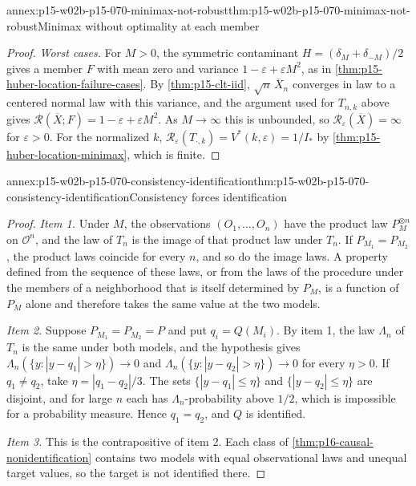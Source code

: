 \begin{annexitem}{annex:p15-w02b-p15-070-minimax-not-robust}{thm:p15-w02b-p15-070-minimax-not-robust}{Minimax without optimality at each member}
\begin{proof}
\emph{Worst cases.} For \(M>0\), the symmetric contaminant
\(H=(\delta_M+\delta_{-M})/2\) gives a member \(F\) with mean zero and
variance \(1-\varepsilon+\varepsilon M^2\), as in
\cref{thm:p15-huber-location-failure-cases}. By
\cref{thm:p15-clt-iid}, \(\sqrt n\,\overline X_n\) converges in law to
a centered normal law with this variance, and the argument used for
\(T_{n,k}\) above gives \(\mathcal R(\overline X;F)=1-\varepsilon
+\varepsilon M^2\). As \(M\to\infty\) this is unbounded, so
\(\mathcal R_\varepsilon(\overline X)=\infty\) for \(\varepsilon>0\).
For the normalized \(k\),
\(\mathcal R_\varepsilon(T_{\cdot,k})=V^*(k,\varepsilon)=1/I_*\) by
\cref{thm:p15-huber-location-minimax}, which is finite.
\end{proof}
\end{annexitem}

\begin{annexitem}{annex:p15-w02b-p15-070-consistency-identification}{thm:p15-w02b-p15-070-consistency-identification}{Consistency forces identification}
\begin{proof}
\emph{Item 1.} Under \(M\), the observations
\((O_1,\ldots,O_n)\) have the product law \(P_M^{\otimes n}\) on
\(\mathcal O^n\), and the law of \(T_n\) is the image of that product
law under \(T_n\). If \(P_{M_1}=P_{M_2}\), the product laws coincide for
every \(n\), and so do the image laws. A property defined from the
sequence of these laws, or from the laws of the procedure under the
members of a neighborhood that is itself determined by \(P_M\), is a
function of \(P_M\) alone and therefore takes the same value at the two
models.

\emph{Item 2.} Suppose \(P_{M_1}=P_{M_2}=P\) and put
\(q_i=Q(M_i)\). By item 1, the law \(\Lambda_n\) of \(T_n\) is the same
under both models, and the hypothesis gives
\(\Lambda_n(\{y:|y-q_1|>\eta\})\to0\) and
\(\Lambda_n(\{y:|y-q_2|>\eta\})\to0\) for every \(\eta>0\).
If \(q_1\ne q_2\), take \(\eta=|q_1-q_2|/3\). The sets
\(\{|y-q_1|\leq\eta\}\) and \(\{|y-q_2|\leq\eta\}\) are disjoint, and
for large \(n\) each has \(\Lambda_n\)-probability above \(1/2\), which
is impossible for a probability measure. Hence \(q_1=q_2\), and \(Q\) is
identified.

\emph{Item 3.} This is the contrapositive of item 2. Each class of
\cref{thm:p16-causal-nonidentification} contains two models with equal
observational laws and unequal target values, so the target is not
identified there.
\end{proof}
\end{annexitem}

